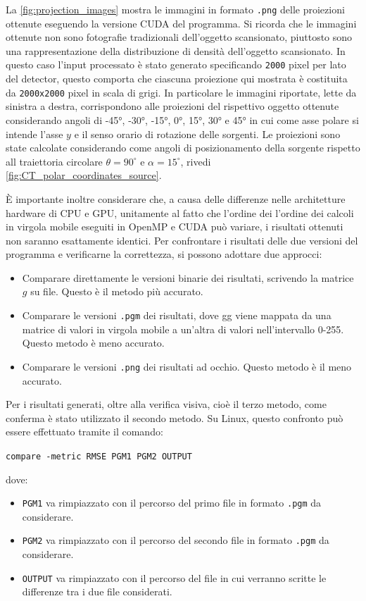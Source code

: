\documentclass[12pt,a4paper]{report}
\begin{document}
La \autoref{fig:projection_images} mostra le immagini in formato \lstinline{.png} delle proiezioni ottenute eseguendo la versione
CUDA del programma.
Si ricorda che le immagini ottenute non sono fotografie tradizionali dell'oggetto scansionato, piuttosto sono una rappresentazione
della distribuzione di densità dell'oggetto scansionato.
In questo caso l'input processato è stato generato specificando \lstinline{2000} pixel per lato del detector, questo comporta che
ciascuna proiezione qui mostrata è costituita da \lstinline{2000x2000} pixel in scala di grigi.
In particolare le immagini riportate, lette da sinistra a destra, corrispondono alle proiezioni del rispettivo oggetto ottenute
considerando angoli di -45°, -30°, -15°, 0°, 15°, 30° e 45° in cui come asse polare si intende l'asse \(y\) e il senso orario di
rotazione delle sorgenti.
Le proiezioni sono state calcolate considerando come angoli di posizionamento della sorgente rispetto all traiettoria circolare
\(\theta = 90^\circ\) e \(\alpha = 15^\circ\), rivedi \autoref{fig:CT_polar_coordinates_source}.

È importante inoltre considerare che, a causa delle differenze nelle architetture hardware di CPU e GPU, unitamente al fatto che
l'ordine dei l'ordine dei calcoli in virgola mobile eseguiti in OpenMP e CUDA può variare, i risultati ottenuti non saranno
esattamente identici.
Per confrontare i risultati delle due versioni del programma e verificarne la correttezza, si possono adottare due approcci:
\begin{itemize}
  \item Comparare direttamente le versioni binarie dei risultati, scrivendo la matrice \(g\) su file.
        Questo è il metodo più accurato.
  \item Comparare le versioni \lstinline{.pgm} dei risultati, dove gg viene mappata da una matrice di valori in virgola mobile a
        un'altra di valori nell'intervallo 0-255.
        Questo metodo è meno accurato.
  \item Comparare le versioni \lstinline{.png} dei risultati ad occhio.
        Questo metodo è il meno accurato.
\end{itemize}
Per i risultati generati, oltre alla verifica visiva, cioè il terzo metodo, come conferma è stato utilizzato il secondo metodo.
Su Linux, questo confronto può essere effettuato tramite il comando:

\lstinline{compare -metric RMSE PGM1 PGM2 OUTPUT}

dove:
\begin{itemize}
  \item \lstinline{PGM1} va rimpiazzato con il percorso del primo file in formato \lstinline{.pgm} da considerare.
  \item \lstinline{PGM2} va rimpiazzato con il percorso del secondo file in formato \lstinline{.pgm} da considerare.
  \item \lstinline{OUTPUT} va rimpiazzato con il percorso del file in cui verranno scritte le differenze tra i due file
        considerati.
\end{itemize}
\end{document}
